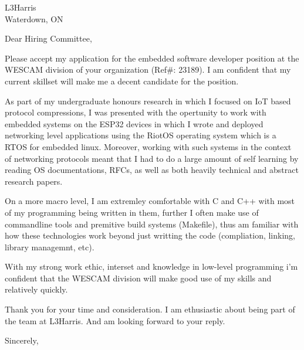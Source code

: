 \documentclass{letter}
\begin{document}
\longindentation=0pt


\begin{letter}{L3Harris \\ Waterdown, ON}
\opening{Dear Hiring Committee,}

Please accept my application for the embedded software developer position at the WESCAM division of your organization
(Ref\#: 23189). I am confident that my current skillset will make me a decent candidate for the position.

As part of my undergraduate honours research in which I focused on IoT based protocol compressions, I was presented with
the opertunity to work with embedded systems on the ESP32 devices in which I wrote and deployed networking level applications
using the RiotOS operating system which is a RTOS for embedded linux. Moreover, working with such systems in the context 
of networking protocols meant that I had to do a large amount of self learning by reading OS documentations, RFCs, as well as both
heavily technical and abstract research papers. 

On a more macro level, I am extremley comfortable with C and C++ with most of my programming being written in them, further I often
make use of commandline tools and premitive build systems (Makefile), thus am familiar with how these technologies work
beyond just writting the code (compliation, linking, library managemnt, etc).

With my strong work ethic, interset and knowledge in low-level programming i'm confident that the WESCAM division will make good use
of my skills and relatively quickly.

Thank you for your time and consideration. I am ethusiastic about being part of the team at L3Harris. And am looking forward to your reply.

\closing{Sincerely,}



\end{letter}
\end{document}
